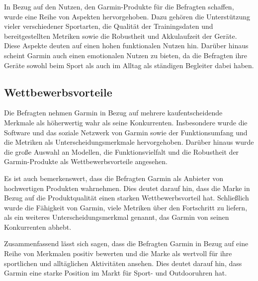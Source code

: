 In Bezug auf den Nutzen, den Garmin-Produkte für die Befragten schaffen, wurde eine Reihe von Aspekten hervorgehoben. Dazu gehören die Unterstützung vieler verschiedener Sportarten, die Qualität der Trainingsdaten und bereitgestellten Metriken sowie die Robustheit und Akkulaufzeit der Geräte. Diese Aspekte deuten auf einen hohen funktionalen Nutzen hin. Darüber hinaus scheint Garmin auch einen emotionalen Nutzen zu bieten, da die Befragten ihre Geräte sowohl beim Sport als auch im Alltag als ständigen Begleiter dabei haben.

\subsection{Wettbewerbsvorteile}
Die Befragten nehmen Garmin in Bezug auf mehrere kaufentscheidende Merkmale als höherwertig wahr als seine Konkurrenten. Insbesondere wurde die Software und das soziale Netzwerk von Garmin sowie der Funktionsumfang und die Metriken als Unterscheidungsmerkmale hervorgehoben. Darüber hinaus wurde die große Auswahl an Modellen, die Funktionsvielfalt und die Robustheit der Garmin-Produkte als Wettbewerbsvorteile angesehen.

Es ist auch bemerkenswert, dass die Befragten Garmin als Anbieter von hochwertigen Produkten wahrnehmen. Dies deutet darauf hin, dass die Marke in Bezug auf die Produktqualität einen starken Wettbewerbsvorteil hat. Schließlich wurde die Fähigkeit von Garmin, viele Metriken über den Fortschritt zu liefern, als ein weiteres Unterscheidungsmerkmal genannt, das Garmin von seinen Konkurrenten abhebt.

Zusammenfassend lässt sich sagen, dass die Befragten Garmin in Bezug auf eine Reihe von Merkmalen positiv bewerten und die Marke als wertvoll für ihre sportlichen und alltäglichen Aktivitäten ansehen. Dies deutet darauf hin, dass Garmin eine starke Position im Markt für Sport- und Outdooruhren hat.


\newpage


